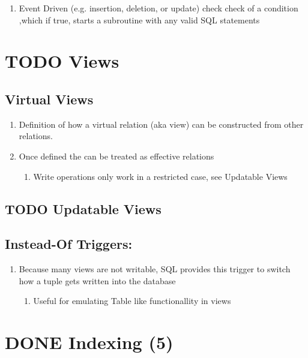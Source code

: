 \documentclass[11pt]{article}
\begin{document}
\begin{enumerate}
\item Event Driven (e.g. insertion, deletion, or update) check
      check of a condition ,which if true, starts a subroutine with
      any valid SQL statements
\end{enumerate}
\section{\textbf{TODO} Views}
\label{sec-7}

\subsection{Virtual Views}
\label{sec-7.1}

\begin{enumerate}
\item Definition of how a virtual relation (aka view) can be
      constructed from other relations.
\item Once defined the can be treated as effective relations

\begin{enumerate}
\item Write operations only work in a restricted case, see
         Updatable Views
\end{enumerate}

\end{enumerate}
\subsection{\textbf{TODO} Updatable Views}
\label{sec-7.2}

\subsection{Instead-Of Triggers:}
\label{sec-7.3}

\begin{enumerate}
\item Because many views are not writable, SQL provides this trigger
      to switch how a tuple gets written into the database

\begin{enumerate}
\item Useful for emulating Table like functionallity in views
\end{enumerate}

\end{enumerate}
\section{\textbf{DONE} Indexing (5)}
\label{sec-8}
\end{document}
